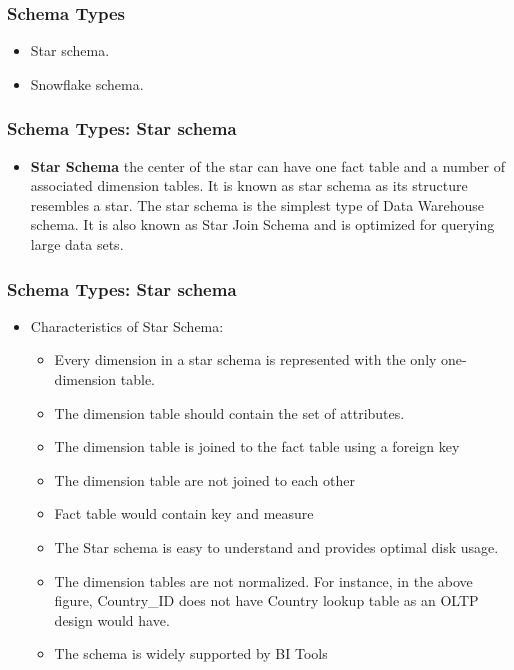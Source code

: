 \begin{frame}
\frametitle{Schema Types}
	\begin{itemize}[<+->]
		\item Star schema.
		\item Snowflake schema.
	\end{itemize}
	
\end{frame}
\begin{frame}
    \frametitle{Schema Types: Star schema}
			\begin{itemize}
				\item \textbf{Star Schema} the center of the star can have one fact table and a number of associated dimension tables. It is known as star schema as its structure resembles a star. The star schema is the simplest type of Data Warehouse schema. It is also known as Star Join Schema and is optimized for querying large data sets.
			\end{itemize}
\end{frame}
\begin{frame}
\frametitle{Schema Types: Star schema}
\begin{itemize}
	\item Characteristics of Star Schema:
	\begin{itemize}
		\item Every dimension in a star schema is represented with the only one-dimension table.
		\item The dimension table should contain the set of attributes.
		\item The dimension table is joined to the fact table using a foreign key
		\item The dimension table are not joined to each other
		\item Fact table would contain key and measure
		\item The Star schema is easy to understand and provides optimal disk usage.
		\item The dimension tables are not normalized. For instance, in the above figure, Country\_ID does not have Country lookup table as an OLTP design would have.
		\item The schema is widely supported by BI Tools
	\end{itemize}
\end{itemize}
\end{frame}
